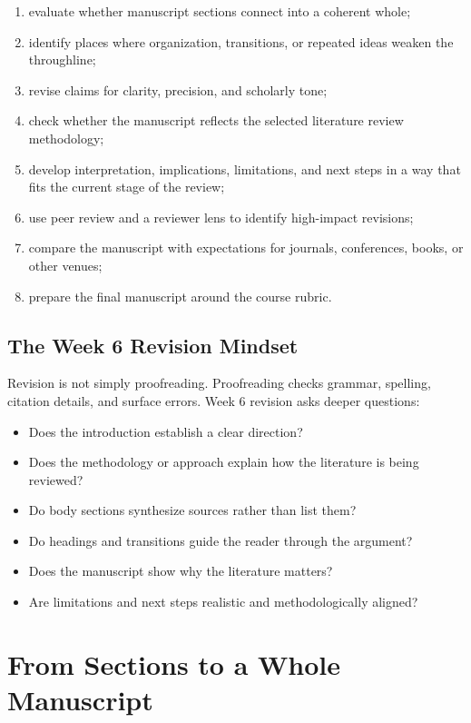 \documentclass[11pt]{article}
\begin{document}
\begin{enumerate}
  \item evaluate whether manuscript sections connect into a coherent whole;
  \item identify places where organization, transitions, or repeated ideas weaken the throughline;
  \item revise claims for clarity, precision, and scholarly tone;
  \item check whether the manuscript reflects the selected literature review methodology;
  \item develop interpretation, implications, limitations, and next steps in a way that fits the current stage of the review;
  \item use peer review and a reviewer lens to identify high-impact revisions;
  \item compare the manuscript with expectations for journals, conferences, books, or other venues;
  \item prepare the final manuscript around the course rubric.
\end{enumerate}

\subsection{The Week 6 Revision Mindset}

Revision is not simply proofreading. Proofreading checks grammar, spelling, citation details, and surface errors. Week 6 revision asks deeper questions:

\begin{itemize}
  \item Does the introduction establish a clear direction?
  \item Does the methodology or approach explain how the literature is being reviewed?
  \item Do body sections synthesize sources rather than list them?
  \item Do headings and transitions guide the reader through the argument?
  \item Does the manuscript show why the literature matters?
  \item Are limitations and next steps realistic and methodologically aligned?
\end{itemize}

\section{From Sections to a Whole Manuscript}
\end{document}
